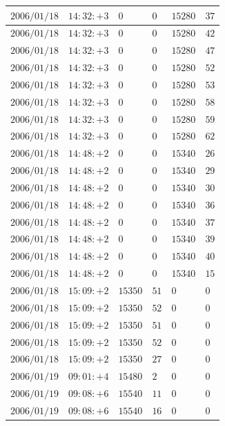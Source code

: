 \documentclass[a4j,papersize,disablejfam,slide,14pt]{jsarticle}
\begin{document}
\begin{description}
\begin{center}
\begin{longtable}{|l|l|l|l|l|l|}
					$2006/01/18$ & $14:32:+3$  & $0$ & $0$ & $15280$ & $37$ \\ \hline
					$2006/01/18$ & $14:32:+3$  & $0$ & $0$ & $15280$ & $42$ \\ \hline
					$2006/01/18$ & $14:32:+3$  & $0$ & $0$ & $15280$ & $47$ \\ \hline
					$2006/01/18$ & $14:32:+3$  & $0$ & $0$ & $15280$ & $52$ \\ \hline
					$2006/01/18$ & $14:32:+3$  & $0$ & $0$ & $15280$ & $53$ \\ \hline
					$2006/01/18$ & $14:32:+3$  & $0$ & $0$ & $15280$ & $58$ \\ \hline
					$2006/01/18$ & $14:32:+3$  & $0$ & $0$ & $15280$ & $59$ \\ \hline
					$2006/01/18$ & $14:32:+3$  & $0$ & $0$ & $15280$ & $62$ \\ \hline
					$2006/01/18$ & $14:48:+2$  & $0$ & $0$ & $15340$ & $26$ \\ \hline
					$2006/01/18$ & $14:48:+2$  & $0$ & $0$ & $15340$ & $29$ \\ \hline
					$2006/01/18$ & $14:48:+2$  & $0$ & $0$ & $15340$ & $30$ \\ \hline
					$2006/01/18$ & $14:48:+2$  & $0$ & $0$ & $15340$ & $36$ \\ \hline
					$2006/01/18$ & $14:48:+2$  & $0$ & $0$ & $15340$ & $37$ \\ \hline
					$2006/01/18$ & $14:48:+2$  & $0$ & $0$ & $15340$ & $39$ \\ \hline
					$2006/01/18$ & $14:48:+2$  & $0$ & $0$ & $15340$ & $40$ \\ \hline
					$2006/01/18$ & $14:48:+2$  & $0$ & $0$ & $15340$ & $15$ \\ \hline
					$2006/01/18$ & $15:09:+2$  & $15350$ & $51$ & $0$ & $0$ \\ \hline
					$2006/01/18$ & $15:09:+2$  & $15350$ & $52$ & $0$ & $0$ \\ \hline
					$2006/01/18$ & $15:09:+2$  & $15350$ & $51$ & $0$ & $0$ \\ \hline
					$2006/01/18$ & $15:09:+2$  & $15350$ & $52$ & $0$ & $0$ \\ \hline
					$2006/01/18$ & $15:09:+2$  & $15350$ & $27$ & $0$ & $0$ \\ \hline
					$2006/01/19$ & $09:01:+4$  & $15480$ & $2$ & $0$ & $0$ \\ \hline
					$2006/01/19$ & $09:08:+6$  & $15540$ & $11$ & $0$ & $0$ \\ \hline
					$2006/01/19$ & $09:08:+6$  & $15540$ & $16$ & $0$ & $0$ \\ \hline

\end{longtable}
\end{center}
\end{description}
\end{document}

